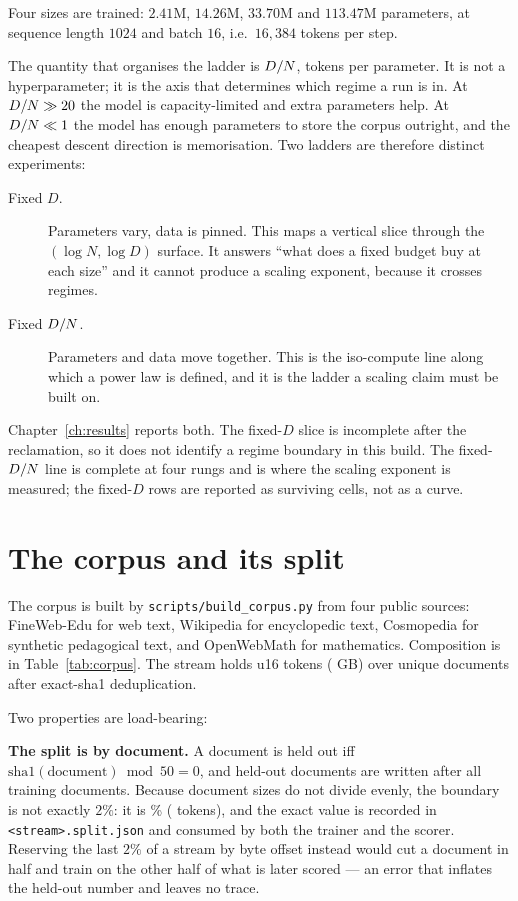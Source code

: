 Four sizes are trained: $2.41$M, $14.26$M, $33.70$M and $113.47$M parameters, at
sequence length $1024$ and batch $16$, i.e.\ $16{,}384$ tokens per step.

The quantity that organises the ladder is $D/N$, tokens per parameter. It is not a
hyperparameter; it is the axis that determines which regime a run is in. At
$D/N \gg 20$ the model is capacity-limited and extra parameters help. At
$D/N \ll 1$ the model has enough parameters to store the corpus outright, and the
cheapest descent direction is memorisation. Two ladders are therefore distinct
experiments:

\begin{description}
  \item[Fixed $D$.] Parameters vary, data is pinned. This maps a vertical slice
  through the $(\log N, \log D)$ surface. It answers ``what does a fixed budget buy
  at each size'' and it cannot produce a scaling exponent, because it crosses
  regimes.
  \item[Fixed $D/N$.] Parameters and data move together. This is the iso-compute
  line along which a power law is defined, and it is the ladder a scaling claim
  must be built on.
\end{description}

Chapter~\ref{ch:results} reports both. The fixed-$D$ slice is incomplete after
the reclamation, so it does not identify a regime boundary in this build. The
fixed-$D/N$ line is complete at four rungs and is where the scaling exponent is
measured; the fixed-$D$ rows are reported as surviving cells, not as a curve.

\section{The corpus and its split}
\label{sec:corpus}

The corpus is built by \texttt{scripts/build\_corpus.py} from four public sources:
FineWeb-Edu \citep{penedo2024fineweb} for web text, Wikipedia for encyclopedic
text, Cosmopedia for synthetic pedagogical text, and OpenWebMath for mathematics.
Composition is in Table~\ref{tab:corpus}. The stream holds \CorpusTokens{} u16
tokens (\CorpusGB{} GB) over \CorpusDocs{} unique documents after exact-sha1
deduplication.



Two properties are load-bearing:

\textbf{The split is by document.} A document is held out iff
$\mathrm{sha1}(\text{document}) \bmod 50 = 0$, and held-out documents are written
after all training documents. Because document sizes do not divide evenly, the
boundary is not exactly $2\%$: it is \HoldoutPct{}\% (\HoldoutTokens{} tokens), and
the exact value is recorded in \texttt{<stream>.split.json} and consumed by both
the trainer and the scorer. Reserving the last $2\%$ of a stream by byte offset
instead would cut a document in half and train on the other half of what is later
scored --- an error that inflates the held-out number and leaves no trace.

